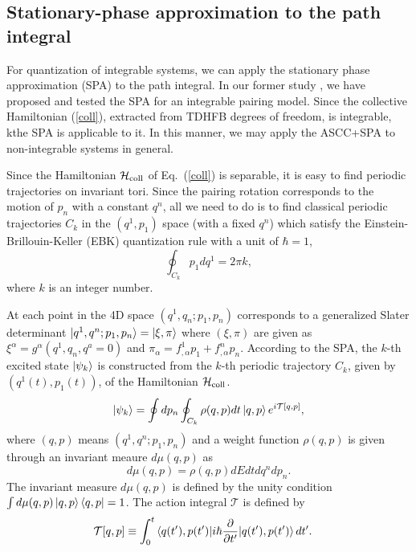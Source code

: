 \documentclass[%
superscriptaddress,
showpacs,
nofootinbib,
amsmath,amssymb,
aps,
prc,
twocolumn,
floatfix ]%
{revtex4-1}
\begin{document}


\subsection{Stationary-phase approximation to the path integral}

For quantization of integrable systems,
we can apply the stationary phase approximation (SPA)
to the path integral.
In our former study \cite{NN18},
we have proposed and tested the SPA for an integrable pairing model.
Since the collective Hamiltonian (\ref{coll}),
extracted from TDHFB degrees of freedom, is integrable,
kthe SPA is applicable to it.
In this manner, we may apply the ASCC+SPA to
non-integrable systems in general.

Since the Hamiltonian $\mathcal{H}_{\rm coll}$ of Eq.~(\ref{coll})
is separable,
it is easy to find periodic trajectories on invariant tori.
Since the pairing rotation corresponds to the motion of $p_n$
with a constant $q^n$,
all we need to do is to find classical periodic trajectories $C_k$ in
the $(q^1,p_1)$ space (with a fixed $q^n$) which satisfy
the Einstein-Brillouin-Keller (EBK) quantization rule
with a unit of $\hbar=1$,
\begin{equation}
	\oint_{C_k} p_1dq^1 = 2\pi k ,
\end{equation}
where $k$ is an integer number.

At each point in the 4D space $(q^1,q_n; p_1,p_n)$ corresponds to
a generalized Slater determinant
$\ket{q^1,q^n;p_1,p_n}=\ket{\xi,\pi}$
where $(\xi,\pi)$ are given as
$\xi^\alpha=g^\alpha(q^1,q_n,q^a=0)$ and
$\pi_\alpha=f^1_{,\alpha}p_1+f^n_{,\alpha}p_n$.
According to the SPA, the $k$-th excited state $\ket{\psi_k}$
is constructed from the $k$-th periodic trajectory $C_k$,
given by $(q^1(t),p_1(t))$,
of the Hamiltonian $\mathcal{H}_{\rm coll}$.
\begin{equation}
\ket{\psi_k} = \oint dp_n \oint_{C_k} \rho(q,p) dt \ket{q,p}
	e^{i\mathcal{T}[q,p]} ,
	\label{SPA}
\end{equation}
where $(q,p)$ means $(q^1,q^n;p_1, p_n)$ and a weight function
$\rho(q,p)$ is given through an invariant meaure $d\mu(q,p)$ as
\begin{equation}
d\mu(q,p)=\rho(q,p) dE dt dq^n dp_n .
\end{equation}
The invariant measure $d\mu(q,p)$ is defined by the unity condition
$\int d\mu(q,p) \ket{q,p}\bra{q,p} = 1$.
The action integral $\mathcal{T}$ is defined by
\begin{align}
\mathcal{T}[q,p] &\equiv
\int_{0}^{t} \braket{q(t'),p(t')| i\hbar\frac{\partial}{\partial t'}
	|q(t'),p(t')} dt' .
\label{tau}
\end{align}
\end{document}
